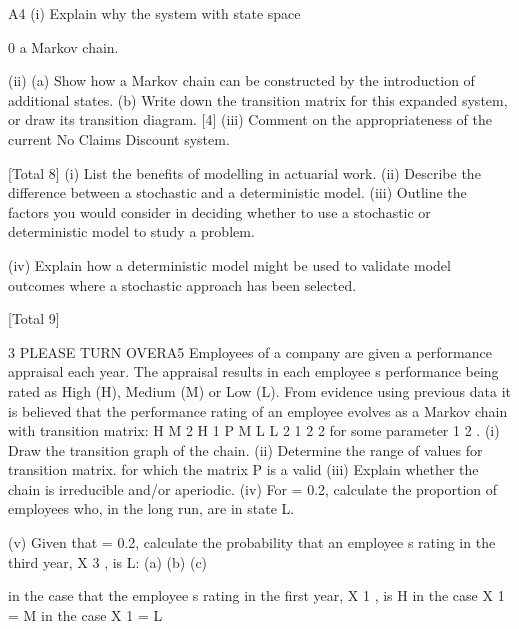 \documentclass[a4paper,12pt]{article}
\begin{document}
\begin{enumerate}
A4
(i) Explain why the system with state space {0%
a Markov chain.

(ii) (a)
Show how a Markov chain can be constructed by the introduction of
additional states.
(b)
Write down the transition matrix for this expanded system, or draw its
transition diagram.
[4]
(iii) Comment on the appropriateness of the current No Claims Discount system.

[Total 8]
(i) List the benefits of modelling in actuarial work. 
(ii) Describe the difference between a stochastic and a deterministic model. 
(iii) Outline the factors you would consider in deciding whether to use a stochastic
or deterministic model to study a problem.

(iv) Explain how a deterministic model might be used to validate model outcomes
where a stochastic approach has been selected.

[Total 9]

 3
PLEASE TURN OVERA5
Employees of a company are given a performance appraisal each year. The appraisal
results in each employee s performance being rated as High (H), Medium (M) or Low
(L). From evidence using previous data it is believed that the performance rating of an
employee evolves as a Markov chain with transition matrix:
H
M
2
H 1
P
M
L
L
2
1 2
2
for some parameter
1
2
.
(i) Draw the transition graph of the chain. 
(ii) Determine the range of values for
transition matrix. 
for which the matrix P is a valid
(iii) Explain whether the chain is irreducible and/or aperiodic.
(iv) For = 0.2, calculate the proportion of employees who, in the long run, are in
state L.

(v) Given that = 0.2, calculate the probability that an employee s rating in the
third year, X 3 , is L:
(a)
(b)
(c)

in the case that the employee s rating in the first year, X 1 , is H
in the case X 1 = M
in the case X 1 = L

}
\end{enumerate}
\end{document}
